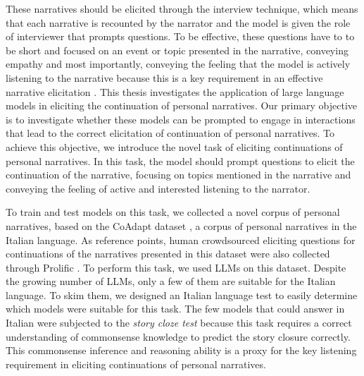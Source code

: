 These narratives should be elicited through the interview technique, which means that each narrative is recounted by the narrator and the model is given the role of interviewer that prompts questions. To be effective, these questions have to to be short and focused on an event or topic presented in the narrative, conveying empathy and most importantly, conveying the feeling that the model is actively listening to the narrative because this is a key requirement in an effective narrative elicitation \cite{Kim2015-es}.
This thesis investigates the application of large language models in eliciting the continuation of personal narratives. Our primary objective is to investigate whether these models can be prompted to engage in interactions that lead to the correct elicitation of continuation of personal narratives. To achieve this objective, we introduce the novel task of eliciting continuations of personal narratives. In this task, the model should prompt questions to elicit the continuation of the narrative, focusing on topics mentioned in the narrative and conveying the feeling of active and interested listening to the narrator.

To train and test models on this task, we collected a novel corpus of personal narratives, based on the CoAdapt dataset \cite{coadapt}, a corpus of personal narratives in the Italian language.
As reference points, human crowdsourced eliciting questions for continuations of the narratives presented in this dataset were also collected through Prolific \cite{prolific}. To perform this task, we used LLMs on this dataset. Despite the growing number of LLMs, only a few of them are suitable for the Italian language. To skim them, we designed an Italian language test to easily determine which models were suitable for this task. The few models that could answer in Italian were subjected to the \emph{story cloze test} \cite{mostafazadeh2016corpus} because this task requires a correct understanding of commonsense knowledge to predict the story closure correctly. This commonsense inference and reasoning ability is a proxy for the key listening requirement in eliciting continuations of personal narratives. 

